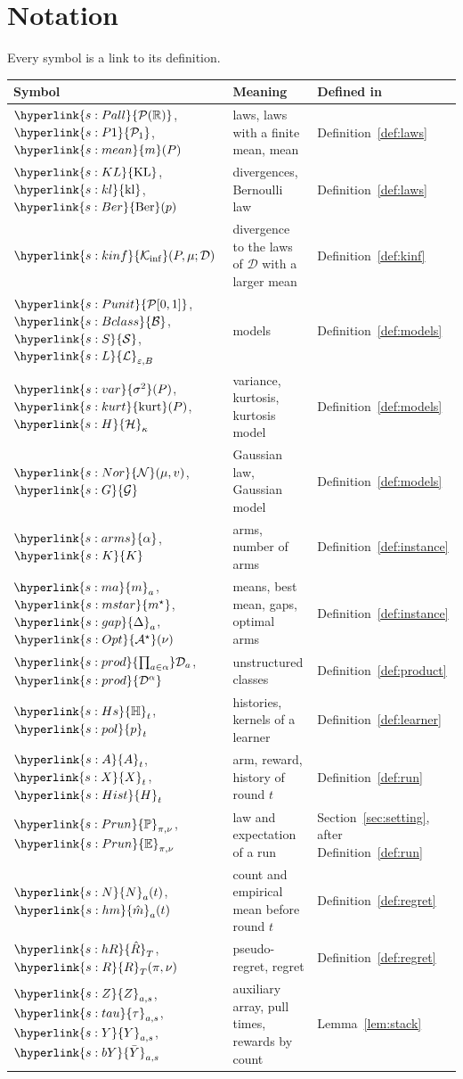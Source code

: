 \documentclass[11pt]{article}
\newcommand{\E}{\mathbb{E}}
\newcommand{\Prob}{\mathbb{P}}
\newcommand{\R}{\mathbb{R}}
\newcommand{\sy}[2]{{\hyperlink{#1}{#2}}}
\newcommand{\Pall}{\sy{s:Pall}{\mathcal{P}(\R)}}
\newcommand{\Pone}{\sy{s:P1}{\mathcal{P}_{1}}}
\newcommand{\mean}{\sy{s:mean}{m}}
\newcommand{\KL}{\sy{s:KL}{\mathrm{KL}}}
\newcommand{\kl}{\sy{s:kl}{\mathrm{kl}}}
\newcommand{\Ber}{\sy{s:Ber}{\mathrm{Ber}}}
\newcommand{\Kinf}{\sy{s:kinf}{\mathcal{K}_{\inf}}}
\newcommand{\Punit}{\sy{s:Punit}{\mathcal{P}[0,1]}}
\newcommand{\Bclass}{\sy{s:Bclass}{\mathcal{B}}}
\newcommand{\Semi}{\sy{s:S}{\mathcal{S}}}
\newcommand{\Lmom}{\sy{s:L}{\mathcal{L}}}
\newcommand{\var}{\sy{s:var}{\sigma^{2}}}
\newcommand{\kurt}{\sy{s:kurt}{\mathrm{kurt}}}
\newcommand{\Hk}{\sy{s:H}{\mathcal{H}}}
\newcommand{\Nor}{\sy{s:Nor}{\mathcal{N}}}
\newcommand{\Gau}{\sy{s:G}{\mathcal{G}}}
\newcommand{\arms}{\sy{s:arms}{\alpha}}
\newcommand{\Karms}{\sy{s:K}{K}}
\newcommand{\marm}{\sy{s:ma}{m}}
\newcommand{\ms}{\sy{s:mstar}{m^{\star}}}
\newcommand{\gap}{\sy{s:gap}{\Delta}}
\newcommand{\Opt}{\sy{s:Opt}{\mathcal{A}^{\star}}}
\newcommand{\prodc}[1]{\sy{s:prod}{\textstyle\prod_{a\in\alpha}}#1_{a}}
\newcommand{\powc}[1]{\sy{s:prod}{#1^{\alpha}}}
\newcommand{\Hs}{\sy{s:Hs}{\mathbb{H}}}
\newcommand{\pol}{\sy{s:pol}{p}}
\newcommand{\Hist}{\sy{s:Hist}{H}}
\newcommand{\Ap}{\sy{s:A}{A}}
\newcommand{\Xr}{\sy{s:X}{X}}
\newcommand{\Pru}{\sy{s:Prun}{\Prob}}
\newcommand{\Er}{\sy{s:Prun}{\E}}
\newcommand{\Np}{\sy{s:N}{N}}
\newcommand{\hR}{\sy{s:hR}{\hat{R}}}
\newcommand{\Reg}{\sy{s:R}{R}}
\newcommand{\hm}{\sy{s:hm}{\hat{m}}}
\newcommand{\taup}{\sy{s:tau}{\tau}}
\newcommand{\Yc}{\sy{s:Y}{Y}}
\newcommand{\bY}{\sy{s:bY}{\bar{Y}}}
\newcommand{\Zc}{\sy{s:Z}{Z}}
\begin{document}
\section{Notation}\label{sec:notation}

Every symbol is a link to its definition.
\begin{center}
\small
\begin{tabular}{@{}lll@{}}
\toprule
Symbol & Meaning & Defined in \\
\midrule
$\Pall$, $\Pone$, $\mean(P)$ & laws, laws with a finite mean, mean & Definition~\ref{def:laws} \\
$\KL$, $\kl$, $\Ber(p)$ & divergences, Bernoulli law & Definition~\ref{def:laws} \\
$\Kinf(P,\mu;\mathcal D)$ & divergence to the laws of $\mathcal D$ with a larger mean & Definition~\ref{def:kinf} \\
$\Punit$, $\Bclass$, $\Semi$, $\Lmom_{\varepsilon,B}$ & models & Definition~\ref{def:models} \\
$\var(P)$, $\kurt(P)$, $\Hk_\kappa$ & variance, kurtosis, kurtosis model & Definition~\ref{def:models} \\
$\Nor(\mu,v)$, $\Gau$ & Gaussian law, Gaussian model & Definition~\ref{def:models} \\
$\arms$, $\Karms$ & arms, number of arms & Definition~\ref{def:instance} \\
$\marm_a$, $\ms$, $\gap_a$, $\Opt(\nu)$ & means, best mean, gaps, optimal arms & Definition~\ref{def:instance} \\
$\prodc{\mathcal D}$, $\powc{\mathcal D}$ & unstructured classes & Definition~\ref{def:product} \\
$\Hs_t$, $\pol_t$ & histories, kernels of a learner & Definition~\ref{def:learner} \\
$\Ap_t$, $\Xr_t$, $\Hist_t$ & arm, reward, history of round $t$ & Definition~\ref{def:run} \\
$\Pru_{\pi,\nu}$, $\Er_{\pi,\nu}$ & law and expectation of a run & Section~\ref{sec:setting}, after Definition~\ref{def:run} \\
$\Np_a(t)$, $\hm_a(t)$ & count and empirical mean before round $t$ & Definition~\ref{def:regret} \\
$\hR_T$, $\Reg_T(\pi,\nu)$ & pseudo-regret, regret & Definition~\ref{def:regret} \\
$\Zc_{a,s}$, $\taup_{a,s}$, $\Yc_{a,s}$, $\bY_{a,s}$ & auxiliary array, pull times, rewards by count & Lemma~\ref{lem:stack} \\

\end{tabular}
\end{center}
\end{document}
